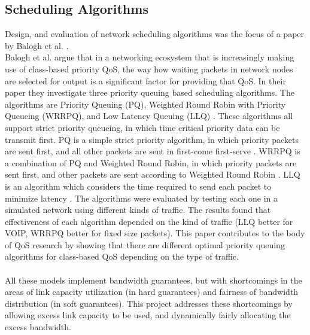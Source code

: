 \documentclass[accepted,single]{gipaper}
\begin{document}
\subsection{Scheduling Algorithms}
\label{algs}

Design, and evaluation of network scheduling algorithms was the focus of a paper by Balogh et al. \cite{Balogh}.
\\


Balogh et al. \cite{Balogh} argue that in a networking ecosystem that is increasingly making use of class-based priority QoS, the way how waiting packets in network nodes are selected for output is a significant factor for providing that QoS. In their paper they investigate three priority queuing based scheduling algorithms. The algorithms are Priority Queuing (PQ), Weighted Round Robin with Priority Queueing (WRRPQ), and Low Latency Queuing (LLQ) \cite{Balogh}. These algorithms all support strict priority queueing, in which time critical priority data can be transmit first. PQ is a simple strict priority algorithm, in which priority packets are sent first, and all other packets are sent in first-come first-serve \cite{Balogh}. WRRPQ is a combination of PQ and Weighted Round Robin, in which priority packets are sent first, and other packets are sent according to Weighted Round Robin \cite{Balogh}. LLQ is an algorithm which considers the time required to send each packet to minimize latency \cite{Balogh}. The algorithms were evaluated by testing each one in a simulated network using different kinds of traffic. The results found that effectiveness of each algorithm depended on the kind of traffic (LLQ better for VOIP, WRRPQ better for fixed size packets). This paper contributes to the body of QoS research by showing that there are different optimal priority queuing algorithms for class-based QoS depending on the type of traffic.
\\\\


\label{prev_work_conclusion}
All these models implement bandwidth guarantees, but with shortcomings in the areas of link capacity utilization (in hard guarantees) and fairness of bandwidth distribution (in soft guarantees). This project addresses these shortcomings by allowing excess link capacity to be used, and dynamically fairly allocating the excess bandwidth.


\iffalse
\end{document}
